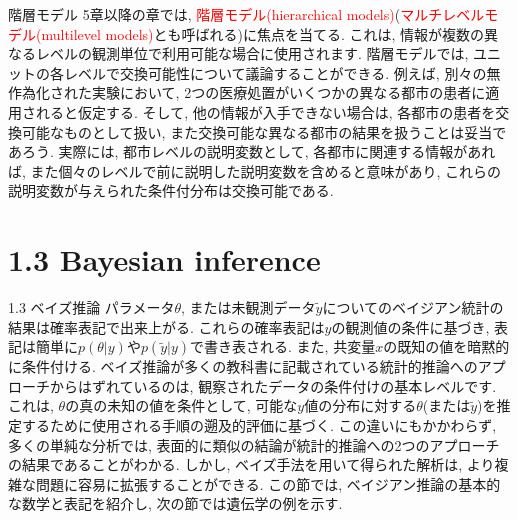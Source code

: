 \documentclass[10pt,dvipdfmx,a4]{beamer}
\newcommand{\tcr}[1]{\textcolor{red}{#1}}
\begin{document}

\begin{frame}{階層モデル}
5章以降の章では, \tcr{階層モデル(hierarchical models)}(\tcr{マルチレベルモデル(multilevel models)}とも呼ばれる)に焦点を当てる.
これは, 情報が複数の異なるレベルの観測単位で利用可能な場合に使用されます.
階層モデルでは, ユニットの各レベルで交換可能性について議論することができる.
例えば, 別々の無作為化された実験において, 2つの医療処置がいくつかの異なる都市の患者に適用されると仮定する.
そして, 他の情報が入手できない場合は, 各都市の患者を交換可能なものとして扱い, また交換可能な異なる都市の結果を扱うことは妥当であろう.
実際には, 都市レベルの説明変数として, 各都市に関連する情報があれば, また個々のレベルで前に説明した説明変数を含めると意味があり, これらの説明変数が与えられた条件付分布は交換可能である.
\end{frame}

\section{1.3 Bayesian inference}
\begin{frame}{1.3 ベイズ推論}
パラメータ$\theta$, または未観測データ$\tilde{y}$についてのベイジアン統計の結果は確率表記で出来上がる.
これらの確率表記は$y$の観測値の条件に基づき, 表記は簡単に$p(\theta|y)$や$p(\tilde{y}|y)$で書き表される.
また, 共変量$x$の既知の値を暗黙的に条件付ける.
ベイズ推論が多くの教科書に記載されている統計的推論へのアプローチからはずれているのは, 観察されたデータの条件付けの基本レベルです.
これは, $\theta$の真の未知の値を条件として, 可能な$y$値の分布に対する$\theta$(または$\tilde{y}$)を推定するために使用される手順の遡及的評価に基づく.
この違いにもかかわらず, 多くの単純な分析では, 表面的に類似の結論が統計的推論への2つのアプローチの結果であることがわかる.
しかし, ベイズ手法を用いて得られた解析は, より複雑な問題に容易に拡張することができる.
この節では, ベイジアン推論の基本的な数学と表記を紹介し, 次の節では遺伝学の例を示す.
\end{frame}

\end{document}
